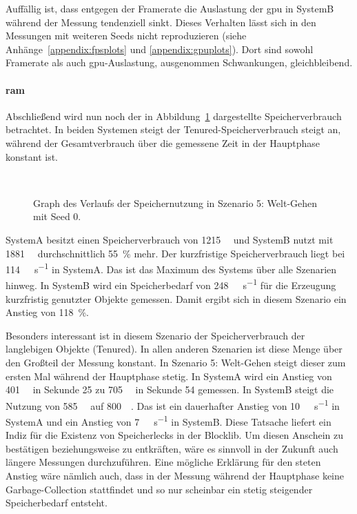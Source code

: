Auffällig ist, dass entgegen der Framerate die Auslastung der \ac{gpu} in SystemB während der Messung tendenziell sinkt. Dieses Verhalten lässt sich in den Messungen mit weiteren Seeds nicht reproduzieren (siehe Anhänge~\vref{appendix:fpsplots} und \vref{appendix:gpuplots}). Dort sind sowohl Framerate als auch \ac{gpu}-Auslastung, ausgenommen Schwankungen, gleichbleibend.

\paragraph{\ac{ram}}
Abschließend wird nun noch der in Abbildung~\ref{fig:seed-0-walk-mem} dargestellte Speicherverbrauch betrachtet. In beiden Systemen steigt der Tenured-Speicherverbrauch steigt an, während der Gesamtverbrauch über die gemessene Zeit in der Hauptphase konstant ist.
\begin{figure}[!htbp]
	\\
	\caption{Graph des Verlaufs der Speichernutzung in Szenario 5: Welt-Gehen mit Seed 0.}\label{fig:seed-0-walk-mem}
\end{figure} 
SystemA besitzt einen Speicherverbrauch von \SI{1215}{\mega\byte} und SystemB nutzt mit \SI{1881}{\mega\byte} durchschnittlich \SI{55}{\percent} mehr. Der kurzfristige Speicherverbrauch liegt bei \SI{114}{\mega\byte\per\second} in SystemA. Das ist das Maximum des Systems über alle Szenarien hinweg. In SystemB wird ein Speicherbedarf von \SI{248}{\mega\byte\per\second} für die Erzeugung kurzfristig genutzter Objekte gemessen. Damit ergibt sich in diesem Szenario ein Anstieg von \SI{118}{\percent}. 

Besonders interessant ist in diesem Szenario der Speicherverbrauch der langlebigen Objekte (Tenured). In allen anderen Szenarien ist diese Menge über den Großteil der Messung konstant.
In Szenario 5: Welt-Gehen steigt dieser zum ersten Mal während der Hauptphase stetig. In SystemA wird ein Anstieg von \SI{401}{\mega\byte} in Sekunde 25 zu \SI{705}{\mega\byte} in Sekunde 54 gemessen. In SystemB steigt die Nutzung von \SI{585}{\mega\byte} auf \SI{800}{\mega\byte}. Das ist ein dauerhafter Anstieg von \SI{10}{\mega\byte\per\second} in SystemA und ein Anstieg von \SI{7}{\mega\byte\per\second} in SystemB. Diese Tatsache liefert ein Indiz für die Existenz von Speicherlecks in der Blocklib. Um diesen Anschein zu bestätigen beziehungsweise zu entkräften, wäre es sinnvoll in der Zukunft auch längere Messungen durchzuführen. Eine mögliche Erklärung für den steten Anstieg wäre nämlich auch, dass in der Messung während der Hauptphase keine Garbage-Collection stattfindet und so nur scheinbar ein stetig steigender Speicherbedarf entsteht.

